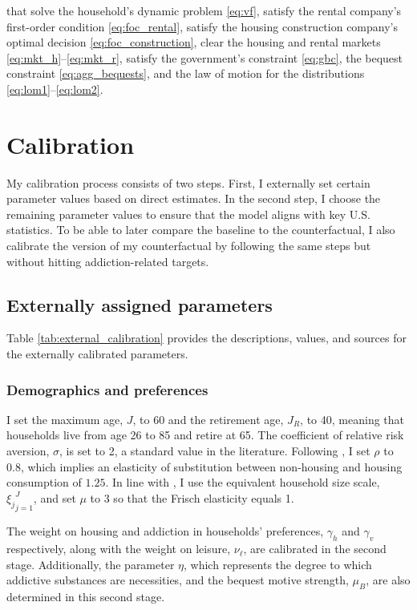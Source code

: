 \documentclass[parskip=full]{article}
\begin{document}
\noindent that solve the household's dynamic problem \eqref{eq:vf}, satisfy the rental company's first-order condition \eqref{eq:foc_rental}, satisfy the housing construction company's optimal decision \eqref{eq:foc_construction}, clear the housing and rental markets \eqref{eq:mkt_h}--\eqref{eq:mkt_r}, satisfy the government's constraint \eqref{eq:gbc}, the bequest constraint \eqref{eq:agg_bequests}, and the law of motion for the distributions \eqref{eq:lom1}--\eqref{eq:lom2}.

\section{Calibration}\label{sec:calibartion}

My calibration process consists of two steps. First, I externally set certain parameter values based on direct estimates. In the second step, I choose the remaining parameter values to ensure that the model aligns with key U.S. statistics. To be able to later compare the baseline to the counterfactual, I also calibrate the version of my counterfactual by following the same steps but without hitting addiction-related targets.

\subsection{Externally assigned parameters}\label{sec:external_calib}

Table \ref{tab:external_calibration} provides the descriptions, values, and sources for the externally calibrated parameters.

\subsubsection{Demographics and preferences}
I set the maximum age, $J$, to 60 and the retirement age, $J_R$, to 40, meaning that households live from age 26 to 85 and retire at 65. The coefficient of relative risk aversion, $\sigma$, is set to 2, a standard value in the literature. Following \citet{kaplanetal-2019}, I set $\rho$ to $0.8$, which implies an elasticity of substitution between non-housing and housing consumption of $1.25$. In line with \citet{rs-2023}, I use the equivalent household size scale, ${\xi_j}_{j=1}^{J}$, and set $\mu$ to 3 so that the Frisch elasticity equals 1.

The weight on housing and addiction in households' preferences, $\gamma_h$ and $\gamma_v$ respectively, along with the weight on leisure, $\nu_{\ell}$, are calibrated in the second stage. Additionally, the parameter $\eta$, which represents the degree to which addictive substances are necessities, and the bequest motive strength, $\mu_B$, are also determined in this second stage.
\end{document}
